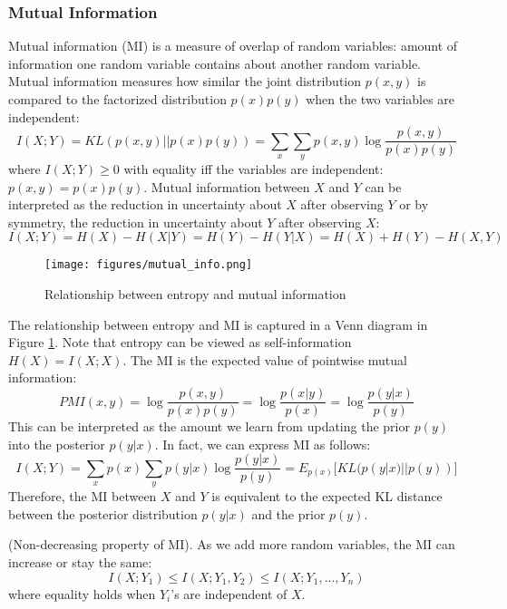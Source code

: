 \subsubsection{Mutual Information}

Mutual information (MI) is a measure of overlap of random variables: amount of information one random variable contains about another random variable. Mutual information measures how similar the joint distribution $p(x,y)$ is compared to the factorized distribution $p(x)p(y)$ when the two variables are independent:
\begin{equation}
    I(X;Y) = KL(p(x,y)||p(x)p(y)) = \sum_x \sum_y p(x,y) \log \frac{p(x,y)}{p(x)p(y)}
\end{equation}
where $I(X;Y)\geq 0$ with equality iff the variables are independent: $p(x,y)=p(x)p(y)$. Mutual information between $X$ and $Y$ can be interpreted as the reduction in uncertainty about $X$ after observing $Y$ or by symmetry, the reduction in uncertainty about $Y$ after observing $X$:
\begin{equation}
    I(X;Y) = H(X) - H(X|Y) = H(Y) - H(Y|X) = H(X) + H(Y) - H(X,Y)
\end{equation}
\begin{figure}[tbhp]
    \centering
    \texttt{[image: figures/mutual\_info.png]}
    \caption{Relationship between entropy and mutual information}
    \label{fig:mutual_info}
\end{figure}
The relationship between entropy and MI is captured in a Venn diagram in Figure \ref{fig:mutual_info}. Note that entropy can be viewed as self-information $H(X) = I(X;X)$. The MI is the expected value of pointwise mutual information:
\begin{equation}
    PMI(x,y) = \log \frac{p(x,y)}{p(x)p(y)} = \log \frac{p(x|y)}{p(x)} = \log \frac{p(y|x)}{p(y)}
\end{equation}
This can be interpreted as the amount we learn from updating the prior $p(y)$ into the posterior $p(y|x)$. In fact, we can express MI as follows:
\begin{equation}
    I(X;Y) = \sum_x p(x) \sum_y p(y|x) \log \frac{p(y|x)}{p(y)} = E_{p(x)}\big[KL(p(y|x)||p(y)) \big]
\end{equation}
Therefore, the MI between $X$ and $Y$ is equivalent to the expected KL distance between the posterior distribution $p(y|x)$ and the prior $p(y)$.

\begin{theorem}
(Non-decreasing property of MI). As we add more random variables, the MI can increase or stay the same:
\begin{equation}
    I(X; Y_1) \leq I(X; Y_1, Y_2) \leq I(X; Y_1,...,Y_n)
\end{equation}
where equality holds when $Y_i$'s are independent of $X$.
\end{theorem}

